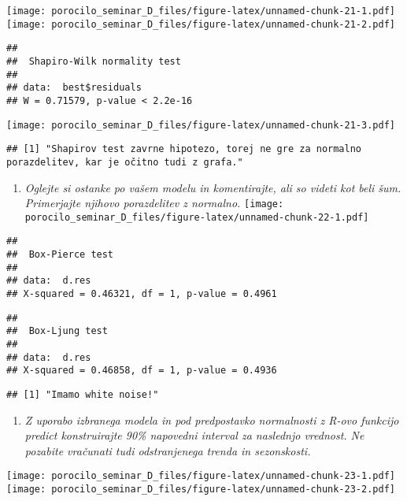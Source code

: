 \documentclass[
]{article}
\providecommand{\tightlist}{%
  \setlength{\itemsep}{0pt}\setlength{\parskip}{0pt}}
\begin{document}
\texttt{[image: porocilo\_seminar\_D\_files/figure-latex/unnamed-chunk-21-1.pdf]}
\texttt{[image: porocilo\_seminar\_D\_files/figure-latex/unnamed-chunk-21-2.pdf]}

\begin{verbatim}
## 
##  Shapiro-Wilk normality test
## 
## data:  best$residuals
## W = 0.71579, p-value < 2.2e-16
\end{verbatim}

\texttt{[image: porocilo\_seminar\_D\_files/figure-latex/unnamed-chunk-21-3.pdf]}

\begin{verbatim}
## [1] "Shapirov test zavrne hipotezo, torej ne gre za normalno porazdelitev, kar je očitno tudi z grafa."
\end{verbatim}

\begin{enumerate}
\def\labelenumi{\arabic{enumi}.}
\setcounter{enumi}{6}
\tightlist
\item
  \emph{Oglejte si ostanke po vašem modelu in komentirajte, ali so
  videti kot beli šum. Primerjajte njihovo porazdelitev z normalno.}
  \texttt{[image: porocilo\_seminar\_D\_files/figure-latex/unnamed-chunk-22-1.pdf]}
\end{enumerate}

\begin{verbatim}
## 
##  Box-Pierce test
## 
## data:  d.res
## X-squared = 0.46321, df = 1, p-value = 0.4961
\end{verbatim}

\begin{verbatim}
## 
##  Box-Ljung test
## 
## data:  d.res
## X-squared = 0.46858, df = 1, p-value = 0.4936
\end{verbatim}

\begin{verbatim}
## [1] "Imamo white noise!"
\end{verbatim}

\begin{enumerate}
\def\labelenumi{\arabic{enumi}.}
\setcounter{enumi}{7}
\tightlist
\item
  \emph{Z uporabo izbranega modela in pod predpostavko normalnosti z
  R-ovo funkcijo predict konstruirajte 90\% napovedni interval za
  naslednjo vrednost. Ne pozabite vračunati tudi odstranjenega trenda in
  sezonskosti.}
\end{enumerate}

\texttt{[image: porocilo\_seminar\_D\_files/figure-latex/unnamed-chunk-23-1.pdf]}
\texttt{[image: porocilo\_seminar\_D\_files/figure-latex/unnamed-chunk-23-2.pdf]}
\end{document}
